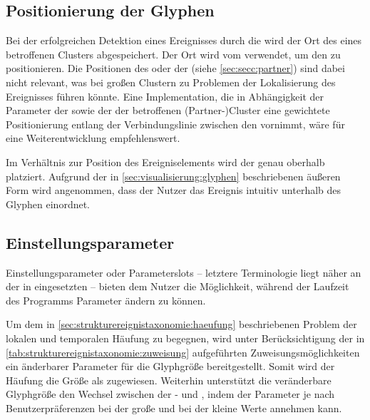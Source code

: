 \subsection*{Positionierung der Glyphen}\label{sec:vis:glyph-pos}

Bei der erfolgreichen Detektion eines Ereignisses durch die  wird der Ort des  eines betroffenen Clusters abgespeichert. Der Ort wird vom  verwendet, um den  zu positionieren. Die Positionen des oder der  (siehe \autoref{sec:secc:partner}) sind dabei nicht relevant, was bei großen Clustern zu Problemen der Lokalisierung des Ereignisses führen könnte. Eine Implementation, die in Abhängigkeit der Parameter der  sowie der  der betroffenen (Partner-)Cluster eine gewichtete Positionierung entlang der Verbindungslinie zwischen den  vornimmt, wäre für eine Weiterentwicklung empfehlenswert.

Im Verhältnis zur Position des Ereigniselements wird der  genau oberhalb platziert. Aufgrund der in \autoref{sec:visualisierung:glyphen} beschriebenen äußeren Form wird angenommen, dass der Nutzer das Ereignis intuitiv unterhalb des Glyphen einordnet.


\subsection*{Einstellungsparameter}\label{sec:vis:renderer:param}
Einstellungsparameter oder Parameterslots -- letztere Terminologie liegt näher an der in  eingesetzten -- bieten dem Nutzer die Möglichkeit, während der Laufzeit des Programms Parameter ändern zu können.

Um dem in \autoref{sec:strukturereignistaxonomie:haeufung} beschriebenen Problem der lokalen und temporalen Häufung zu begegnen, wird unter Berücksichtigung der in \autoref{tab:strukturereignistaxonomie:zuweisung} aufgeführten Zuweisungsmöglichkeiten ein änderbarer Parameter für die Glyphgröße  bereitgestellt. Somit wird der Häufung die Größe als  zugewiesen. Weiterhin unterstützt die veränderbare Glyphgröße den Wechsel zwischen der - und , indem der Parameter je nach Benutzerpräferenzen bei der  große und bei der  kleine Werte annehmen kann.

